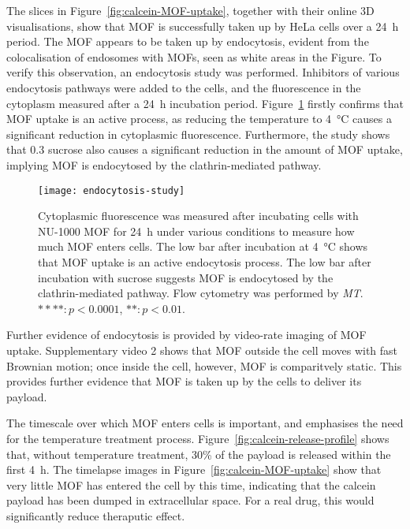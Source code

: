 The slices in Figure~\ref{fig:calcein-MOF-uptake}, together with their online 3D visualisations, show that MOF is successfully taken up by HeLa cells over a \SI{24}{\hour} period. 
The MOF appears to be taken up by endocytosis, evident from the colocalisation of endosomes with MOFs, seen as white areas in the Figure. 
To verify this observation, an endocytosis study was performed.
Inhibitors of various endocytosis pathways were added to the cells, and the fluorescence in the cytoplasm measured after a \SI{24}{\hour} incubation period. 
Figure~\ref{fig:endocytosis-study} firstly confirms that MOF uptake is an active process, as reducing the temperature to \SI{4}{\degreeCelsius} causes a significant reduction in cytoplasmic fluorescence. 
Furthermore, the study shows that \SI{0.3}{\Molar} sucrose also causes a significant reduction in the amount of MOF uptake, implying MOF is endocytosed by the clathrin-mediated pathway. 

\begin{figure}[htbp!]
\centering
\texttt{[image: endocytosis-study]}
\caption[MOFs: An endocytosis study shows NU-1000 MOF is taken up by HeLa cells through the clathrin-mediated pathway]{Cytoplasmic fluorescence was measured after incubating cells with NU-1000 MOF for \SI{24}{\hour} under various conditions to measure how much MOF enters cells. The low bar after incubation at \SI{4}{\degreeCelsius} shows that MOF uptake is an active endocytosis process. The low bar after incubation with sucrose suggests MOF is endocytosed by the clathrin-mediated pathway. Flow cytometry was performed by \textit{MT}. $****: p<0.0001$, $**: p<0.01$. }
\label{fig:endocytosis-study}
\end{figure}

Further evidence of endocytosis is provided by video-rate imaging of MOF uptake.
Supplementary video 2 shows that MOF outside the cell moves with fast Brownian motion; once inside the cell, however, MOF is comparitvely static. 
This provides further evidence that MOF is taken up by the cells to deliver its payload. 

The timescale over which MOF enters cells is important, and emphasises the need for the temperature treatment process. 
Figure~\ref{fig:calcein-release-profile} shows that, without temperature treatment, 30\% of the payload is released within the first \SI{4}{\hour}. 
The timelapse images in Figure~\ref{fig:calcein-MOF-uptake} show that very little MOF has entered the cell by this time, indicating that the calcein payload has been dumped in extracellular space. 
For a real drug, this would significantly reduce theraputic effect. %


